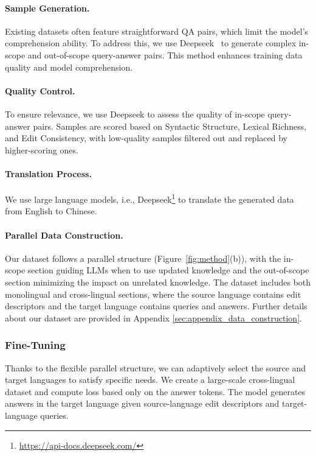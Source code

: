 \paragraph{Sample Generation.} Existing datasets often feature straightforward QA pairs, which limit the model's comprehension ability. To address this, we use Deepseek~\cite{liu2024deepseek} to generate complex in-scope and out-of-scope query-answer pairs. This method enhances training data quality and model comprehension.

\paragraph{Quality Control.} To ensure relevance, we use Deepseek to assess the quality of in-scope query-answer pairs. Samples are scored based on Syntactic Structure, Lexical Richness, and Edit Consistency, with low-quality samples filtered out and replaced by higher-scoring ones.

\paragraph{Translation Process.} We use large language models, i.e., Deepseek\footnote{\url{https://api-docs.deepseek.com/}} to translate the generated data from English to Chinese.

\paragraph{Parallel Data Construction.} Our dataset follows a parallel structure (Figure~\ref{fig:method}(b)), with the in-scope section guiding LLMs when to use updated knowledge and the out-of-scope section minimizing the impact on unrelated knowledge. The dataset includes both monolingual and cross-lingual sections, where the source language contains edit descriptors and the target language contains queries and answers. Further details about our dataset are provided in Appendix \ref{sec:appendix_data_construction}.

\subsubsection{Fine-Tuning}

Thanks to the flexible parallel structure, we can adaptively select the source and target languages to satisfy specific needs. We create a large-scale cross-lingual dataset and compute loss based only on the answer tokens. The model generates answers in the target language given source-language edit descriptors and target-language queries.

